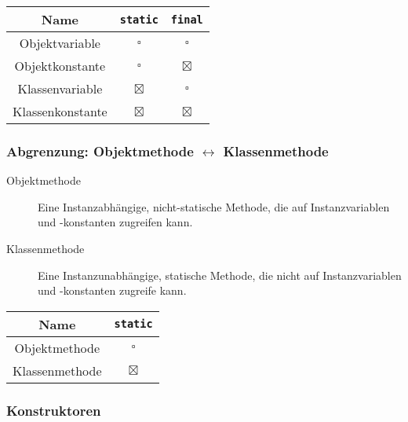 		\begin{table}[H]
			\centering
			\begin{tabular}{c | c | c}
				 \textbf{Name}   & \lstinline|static| & \lstinline|final| \\ \hline
				 Objektvariable  & \(\square\)        & \(\square\)       \\
				Objektkonstante  & \(\square\)        & \(\boxtimes\)     \\
				Klassenvariable  & \(\boxtimes\)      & \(\square\)       \\
				Klassenkonstante & \(\boxtimes\)      & \(\boxtimes\)
			\end{tabular}
		\end{table}
	
	\subsubsection{Abgrenzung: Objektmethode \(\leftrightarrow\) Klassenmethode}
		\begin{description}
			\item[Objektmethode] Eine Instanzabhängige, nicht-statische Methode, die auf Instanzvariablen und -konstanten zugreifen kann.
			\item[Klassenmethode] Eine Instanzunabhängige, statische Methode, die nicht auf Instanzvariablen und -konstanten zugreife kann.
		\end{description}
	
		\begin{table}[H]
			\centering
			\begin{tabular}{c | c}
				\textbf{Name}  & \lstinline|static| \\ \hline
				Objektmethode  & \(\square\)        \\
				Klassenmethode & \(\boxtimes\)
			\end{tabular}
		\end{table}
	
	\subsubsection{Konstruktoren}
		\label{sec:constructor}
	
